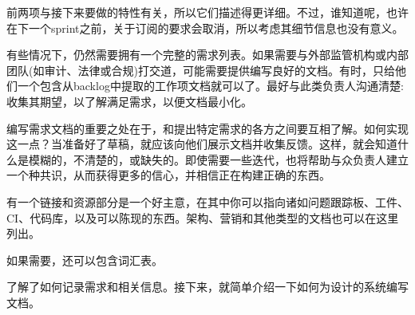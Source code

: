 前两项与接下来要做的特性有关，所以它们描述得更详细。不过，谁知道呢，也许在下一个sprint之前，关于订阅的要求会取消，所以考虑其细节信息也没有意义。

有些情况下，仍然需要拥有一个完整的需求列表。如果需要与外部监管机构或内部团队(如审计、法律或合规)打交道，可能需要提供编写良好的文档。有时，只给他们一个包含从backlog中提取的工作项文档就可以了。最好与此类负责人沟通清楚:收集其期望，以了解满足需求，以便文档最小化。

编写需求文档的重要之处在于，和提出特定需求的各方之间要互相了解。如何实现这一点？当准备好了草稿，就应该向他们展示文档并收集反馈。这样，就会知道什么是模糊的，不清楚的，或缺失的。即使需要一些迭代，也将帮助与众负责人建立一个种共识，从而获得更多的信心，并相信正在构建正确的东西。


有一个链接和资源部分是一个好主意，在其中你可以指向诸如问题跟踪板、工件、CI、代码库，以及可以陈现的东西。架构、营销和其他类型的文档也可以在这里列出。

如果需要，还可以包含词汇表。

了解了如何记录需求和相关信息。接下来，就简单介绍一下如何为设计的系统编写文档。


